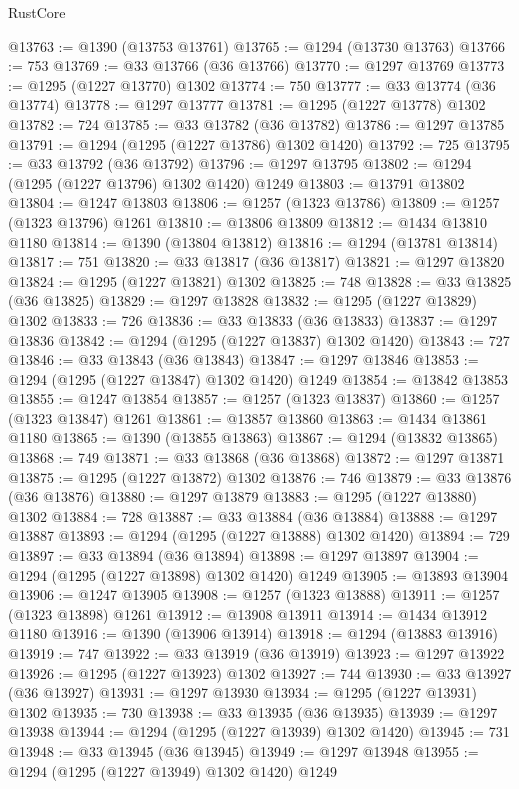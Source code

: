 \begin{lexlean}{RustCore}
\begin{coremodule}
@13763 := @1390 (@13753 @13761)
@13765 := @1294 (@13730 @13763)
@13766 := 753
@13769 := @33 @13766 (@36 @13766)
@13770 := @1297 @13769
@13773 := @1295 (@1227 @13770) @1302
@13774 := 750
@13777 := @33 @13774 (@36 @13774)
@13778 := @1297 @13777
@13781 := @1295 (@1227 @13778) @1302
@13782 := 724
@13785 := @33 @13782 (@36 @13782)
@13786 := @1297 @13785
@13791 := @1294 (@1295 (@1227 @13786) @1302 @1420)
@13792 := 725
@13795 := @33 @13792 (@36 @13792)
@13796 := @1297 @13795
@13802 := @1294 (@1295 (@1227 @13796) @1302 @1420) @1249
@13803 := @13791 @13802
@13804 := @1247 @13803
@13806 := @1257 (@1323 @13786)
@13809 := @1257 (@1323 @13796) @1261
@13810 := @13806 @13809
@13812 := @1434 @13810 @1180
@13814 := @1390 (@13804 @13812)
@13816 := @1294 (@13781 @13814)
@13817 := 751
@13820 := @33 @13817 (@36 @13817)
@13821 := @1297 @13820
@13824 := @1295 (@1227 @13821) @1302
@13825 := 748
@13828 := @33 @13825 (@36 @13825)
@13829 := @1297 @13828
@13832 := @1295 (@1227 @13829) @1302
@13833 := 726
@13836 := @33 @13833 (@36 @13833)
@13837 := @1297 @13836
@13842 := @1294 (@1295 (@1227 @13837) @1302 @1420)
@13843 := 727
@13846 := @33 @13843 (@36 @13843)
@13847 := @1297 @13846
@13853 := @1294 (@1295 (@1227 @13847) @1302 @1420) @1249
@13854 := @13842 @13853
@13855 := @1247 @13854
@13857 := @1257 (@1323 @13837)
@13860 := @1257 (@1323 @13847) @1261
@13861 := @13857 @13860
@13863 := @1434 @13861 @1180
@13865 := @1390 (@13855 @13863)
@13867 := @1294 (@13832 @13865)
@13868 := 749
@13871 := @33 @13868 (@36 @13868)
@13872 := @1297 @13871
@13875 := @1295 (@1227 @13872) @1302
@13876 := 746
@13879 := @33 @13876 (@36 @13876)
@13880 := @1297 @13879
@13883 := @1295 (@1227 @13880) @1302
@13884 := 728
@13887 := @33 @13884 (@36 @13884)
@13888 := @1297 @13887
@13893 := @1294 (@1295 (@1227 @13888) @1302 @1420)
@13894 := 729
@13897 := @33 @13894 (@36 @13894)
@13898 := @1297 @13897
@13904 := @1294 (@1295 (@1227 @13898) @1302 @1420) @1249
@13905 := @13893 @13904
@13906 := @1247 @13905
@13908 := @1257 (@1323 @13888)
@13911 := @1257 (@1323 @13898) @1261
@13912 := @13908 @13911
@13914 := @1434 @13912 @1180
@13916 := @1390 (@13906 @13914)
@13918 := @1294 (@13883 @13916)
@13919 := 747
@13922 := @33 @13919 (@36 @13919)
@13923 := @1297 @13922
@13926 := @1295 (@1227 @13923) @1302
@13927 := 744
@13930 := @33 @13927 (@36 @13927)
@13931 := @1297 @13930
@13934 := @1295 (@1227 @13931) @1302
@13935 := 730
@13938 := @33 @13935 (@36 @13935)
@13939 := @1297 @13938
@13944 := @1294 (@1295 (@1227 @13939) @1302 @1420)
@13945 := 731
@13948 := @33 @13945 (@36 @13945)
@13949 := @1297 @13948
@13955 := @1294 (@1295 (@1227 @13949) @1302 @1420) @1249

\end{coremodule}
\end{lexlean}

